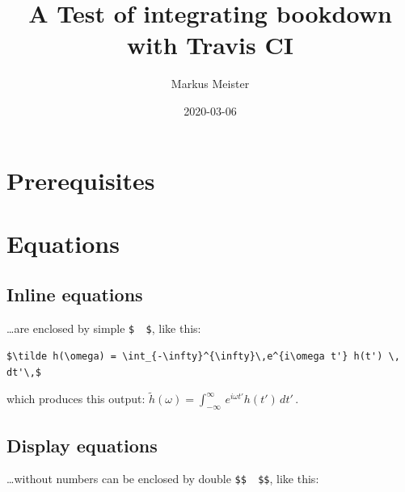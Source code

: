 \documentclass[]{book}
\title{A Test of integrating bookdown with Travis CI}
\author{Markus Meister}
\date{2020-03-06}
\newenvironment{Shaded}{\begin{snugshade}}{\end{snugshade}}
\newcommand{\CommentTok}[1]{\textcolor[rgb]{0.56,0.35,0.01}{\textit{#1}}}
\newcommand{\DataTypeTok}[1]{\textcolor[rgb]{0.13,0.29,0.53}{#1}}
\newcommand{\KeywordTok}[1]{\textcolor[rgb]{0.13,0.29,0.53}{\textbf{#1}}}
\newcommand{\NormalTok}[1]{#1}
\newcommand{\OperatorTok}[1]{\textcolor[rgb]{0.81,0.36,0.00}{\textbf{#1}}}
\newcommand{\OtherTok}[1]{\textcolor[rgb]{0.56,0.35,0.01}{#1}}
\newcommand{\StringTok}[1]{\textcolor[rgb]{0.31,0.60,0.02}{#1}}
\begin{document}
\maketitle

{
\setcounter{tocdepth}{1}
\tableofcontents
}
\hypertarget{prerequisites}{%
\chapter{Prerequisites}\label{prerequisites}}

\begin{Shaded}
\end{Shaded}

\hypertarget{equations}{%
\chapter{Equations}\label{equations}}

\hypertarget{inline-equations}{%
\section{Inline equations}\label{inline-equations}}

\ldots{}are enclosed by simple \texttt{\$\ \ \$}, like this:

\begin{verbatim}
$\tilde h(\omega) = \int_{-\infty}^{\infty}\,e^{i\omega t'} h(t') \, dt'\,$
\end{verbatim}

which produces this output: \(\tilde h(\omega) = \int_{-\infty}^{\infty}\,e^{i\omega t'} h(t') \, dt'\,\).

\hypertarget{display-equations}{%
\section{Display equations}\label{display-equations}}

\ldots{}without numbers can be enclosed by double \texttt{\$\$\ \ \$\$}, like this:
\end{document}
